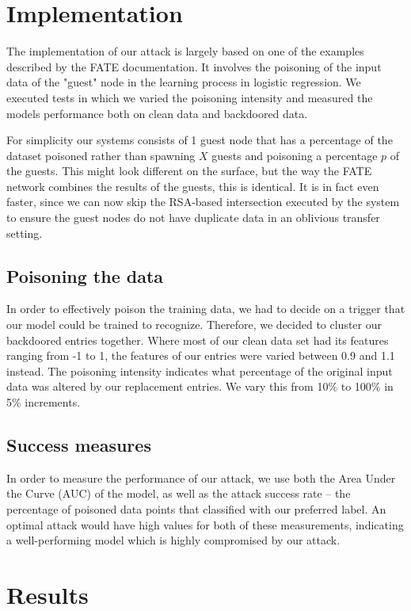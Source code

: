 \documentclass{article}
\begin{document}
\section{Implementation}
The implementation of our attack is largely based on one of the examples described by the FATE documentation. It involves the poisoning of the input data of the "guest" node in the learning process in logistic regression. We executed tests in which we varied the poisoning intensity and measured the models performance both on clean data and backdoored data.

For simplicity our systems consists of 1 guest node that has a percentage of the dataset poisoned rather than spawning $X$ guests and poisoning a percentage $p$ of the guests. This might look different on the surface, but the way the FATE network combines the results of the guests, this is identical. It is in fact even faster, since we can now skip the RSA-based intersection executed by the system to ensure the guest nodes do not have duplicate data in an oblivious transfer setting. 

\subsection{Poisoning the data}
In order to effectively poison the training data, we had to decide on a trigger that our model could be trained to recognize. Therefore, we decided to cluster our backdoored entries together. Where most of our clean data set had its features ranging from -1 to 1, the features of our entries were varied between 0.9 and 1.1 instead. The poisoning intensity indicates what percentage of the original input data was altered by our replacement entries. We vary this from 10\% to 100\% in 5\% increments.

\subsection{Success measures}
In order to measure the performance of our attack, we use both the Area Under the Curve (AUC) of the model, as well as the attack success rate -- the percentage of poisoned data points that classified with our preferred label. An optimal attack would have high values for both of these measurements, indicating a well-performing model which is highly compromised by our attack.

\section{Results}
\end{document}
